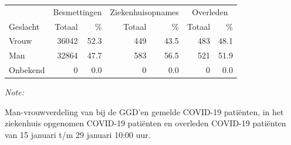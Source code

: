 \documentclass[
  english,
  man,floatsintext]{apa6}
\begin{document}
\begin{table}[H]
\centering\begingroup\fontsize{11}{13}\selectfont

\begin{threeparttable}
\begin{tabular}{lrrrrrr}
\toprule
\multicolumn{1}{c}{ } & \multicolumn{2}{c}{Besmettingen} & \multicolumn{2}{c}{Ziekenhuisopnames} & \multicolumn{2}{c}{Overleden} \\
\cmidrule(l{3pt}r{3pt}){2-3} \cmidrule(l{3pt}r{3pt}){4-5} \cmidrule(l{3pt}r{3pt}){6-7}
Geslacht & Totaal & \% & Totaal & \% & Totaal & \%\\
\midrule
Vrouw & 36042 & 52.3 & 449 & 43.5 & 483 & 48.1\\
Man & 32864 & 47.7 & 583 & 56.5 & 521 & 51.9\\
Onbekend & 0 & 0.0 & 0 & 0.0 & 0 & 0.0\\
\bottomrule
\end{tabular}
\begin{tablenotes}
\item \textit{Note: } 
\item Man-vrouwverdeling van bij de GGD’en gemelde COVID-19 patiënten, in het ziekenhuis opgenomen COVID-19 patiënten en overleden COVID-19 patiënten van 15 januari t/m 29 januari 10:00 uur.
\end{tablenotes}
\end{threeparttable}
\endgroup{}
\end{table}
\newpage
\end{document}
